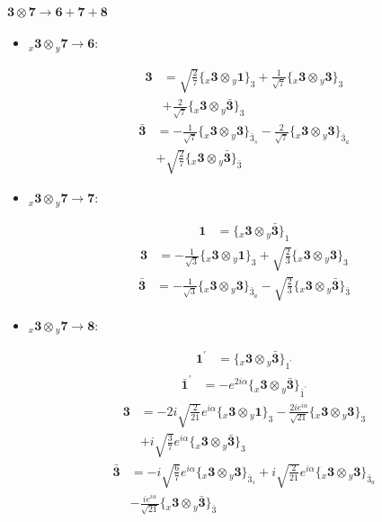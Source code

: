 \documentclass[english]{article}
\newcommand{\cgEqFontsize}{\large}
\newcommand{\rep}[1]{\mathbf{#1}}
\newcommand{\repx}[2]{{}_{#2}\mathbf{#1}}
\newcommand{\tsprod}[2]{\rep{#1}\otimes\rep{#2}}
\newcommand{\tsprodx}[2]{\repx{#1}{x}\otimes\repx{#2}{y}}
\newcommand{\subcgt}[3]{\big\{ \tsprodx{#1}{#2}\big\}^{}_{#3}}
\newcommand{\bfl}{\begin{fleqn}[25pt]}
\newcommand{\efl}{\end{fleqn}}
\begin{document}
\paragraph*{\cgEqFontsize $\tsprod{3}{7}\to\rep{6}+\rep{7}+\rep{8}$}
\begin{itemize}
\item $\tsprodx{3}{7}\to\rep{6}$:
\bfl
\begin{align*}
\rep{3} & = \sqrt{\frac{2}{7}}\subcgt{3}{1}{3}+\frac{1}{\sqrt{7}}\subcgt{3}{3}{3} \\ 
 & +\frac{2}{\sqrt{7}}\subcgt{3}{\bar{3}}{3}
\end{align*}
\begin{align*}
\rep{\bar{3}} & = -\frac{1}{\sqrt{7}}\subcgt{3}{3}{\bar{3}_{s}}-\frac{2}{\sqrt{7}}\subcgt{3}{3}{\bar{3}_{a}} \\ 
 & +\sqrt{\frac{2}{7}}\subcgt{3}{\bar{3}}{\bar{3}}
\end{align*}
\efl
\item $\tsprodx{3}{7}\to\rep{7}$:
\bfl
\begin{align*}
\rep{1} & = \subcgt{3}{\bar{3}}{1}
\end{align*}
\begin{align*}
\rep{3} & = -\frac{1}{\sqrt{3}}\subcgt{3}{1}{3}+\sqrt{\frac{2}{3}}\subcgt{3}{3}{3}
\end{align*}
\begin{align*}
\rep{\bar{3}} & = -\frac{1}{\sqrt{3}}\subcgt{3}{3}{\bar{3}_{a}}-\sqrt{\frac{2}{3}}\subcgt{3}{\bar{3}}{\bar{3}}
\end{align*}
\efl
\item $\tsprodx{3}{7}\to\rep{8}$:
\bfl
\begin{align*}
\rep{1^{\prime}} & = \subcgt{3}{\bar{3}}{1^{\prime}}
\end{align*}
\begin{align*}
\rep{\bar{1}^{\prime}} & = -e^{2 i \alpha }\subcgt{3}{\bar{3}}{\bar{1}^{\prime}}
\end{align*}
\begin{align*}
\rep{3} & = -2 i \sqrt{\frac{2}{21}} e^{i \alpha }\subcgt{3}{1}{3}-\frac{2 i e^{i \alpha }}{\sqrt{21}}\subcgt{3}{3}{3} \\ 
 & +i \sqrt{\frac{3}{7}} e^{i \alpha }\subcgt{3}{\bar{3}}{3}
\end{align*}
\begin{align*}
\rep{\bar{3}} & = -i \sqrt{\frac{6}{7}} e^{i \alpha }\subcgt{3}{3}{\bar{3}_{s}}+i \sqrt{\frac{2}{21}} e^{i \alpha }\subcgt{3}{3}{\bar{3}_{a}} \\ 
 & -\frac{i e^{i \alpha }}{\sqrt{21}}\subcgt{3}{\bar{3}}{\bar{3}}
\end{align*}
\efl
\end{itemize}
\end{document}
